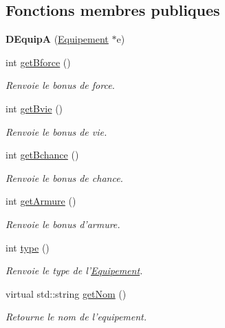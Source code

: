 \subsection*{Fonctions membres publiques}
\begin{DoxyCompactItemize}
\item 
\hypertarget{class_d_equip_a_acbbaea66a8f555ba74e83e287df9fd4c}{{\bfseries D\-Equip\-A} (\hyperlink{class_equipement}{Equipement} $\ast$e)}\label{class_d_equip_a_acbbaea66a8f555ba74e83e287df9fd4c}

\item 
int \hyperlink{class_d_equip_adb6645ce01c12a4cb3fe0b522ea6b25e}{get\-Bforce} ()
\begin{DoxyCompactList}\small\item\em Renvoie le bonus de force. \end{DoxyCompactList}\item 
int \hyperlink{class_d_equip_a085ea4ac21c238d8c147ff4e6d74794f}{get\-Bvie} ()
\begin{DoxyCompactList}\small\item\em Renvoie le bonus de vie. \end{DoxyCompactList}\item 
int \hyperlink{class_d_equip_a39407c92f0de87306a33f57fd22ce997}{get\-Bchance} ()
\begin{DoxyCompactList}\small\item\em Renvoie le bonus de chance. \end{DoxyCompactList}\item 
int \hyperlink{class_d_equip_a7b2c8227ae884c23ccc8f3a2e5702186}{get\-Armure} ()
\begin{DoxyCompactList}\small\item\em Renvoie le bonus d'armure. \end{DoxyCompactList}\item 
int \hyperlink{class_d_equip_a7c31f807517e5940e899780ac6d7a5c3}{type} ()
\begin{DoxyCompactList}\small\item\em Renvoie le type de l'\hyperlink{class_equipement}{Equipement}. \end{DoxyCompactList}\item 
virtual std\-::string \hyperlink{class_equipement_a0b0426a70bfce6e7c3efac605b75cd8e}{get\-Nom} ()
\begin{DoxyCompactList}\small\item\em Retourne le nom de l'equipement. \end{DoxyCompactList}\end{DoxyCompactItemize}
